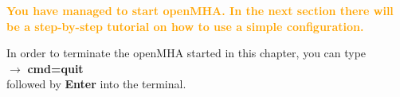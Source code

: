 \documentclass[11pt,a4paper,twoside]{article}
\newcommand{\+}{\discretionary{\mbox{\scriptsize$\hookleftarrow$}}{}{}}
\begin{document}
{{\textcolor{orange}{\textbf{You have managed to start openMHA. In the next section there will be a step-by-step tutorial on how to use a simple configuration.}}

\vspace{1cm}

In order to terminate the openMHA started in this chapter,
you can type \\
$\rightarrow$ {\ttfamily \textbf{cmd=quit}} \\
followed by \textbf{Enter} into the terminal.



\newpage
}}
\end{document}
